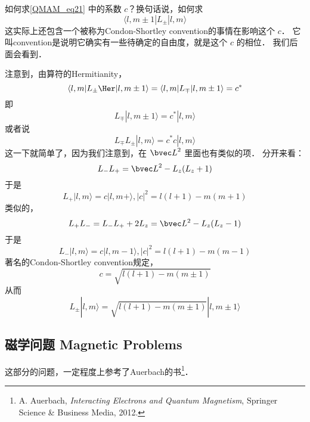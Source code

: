 \begin{exercise}{}\label{QMAM_exe2}
如何求\autoref{QMAM_eq21} 中的系数 $c$？换句话说，如何求
\begin{equation}
\langle l,m\pm1|L_{\pm}|l,m\rangle
\end{equation}
这实际上还包含一个被称为Condon-Shortley convention的事情在影响这个 $c$． 它叫convention是说明它确实有一些待确定的自由度，就是这个 $c$ 的相位． 我们后面会看到．

注意到，由算符的Hermitianity，
\begin{equation}
\langle l,m|L_{\pm}\Her|l,m\pm1\rangle = \langle l,m|L_{\mp}|l,m\pm1\rangle = c^*
\end{equation}
即
\begin{equation}
L_{\mp}|l,m\pm1\rangle = c^*|l,m\rangle
\end{equation}
或者说
\begin{equation}
L_{\mp}L_{\pm}|l,m\rangle = c^*c|l,m\rangle
\end{equation}
这一下就简单了，因为我们注意到，在 ${\bvec L}^2$ 里面也有类似的项． 分开来看：
\begin{equation}
L_-L_+ = {\bvec L}^2 - L_z(L_z+1)
\end{equation}
于是
\begin{equation}
L_+|l,m\rangle = c|l,m+\rangle, |c|^2 = l(l+1)-m(m+1)
\end{equation}
类似的，
\begin{equation}
L_+L_- = L_-L_+ +2L_z = {\bvec L^2} -L_z(L_z-1)
\end{equation}
于是
\begin{equation}
L_-|l,m\rangle = c|l,m-1\rangle, |c|^2 = l(l+1)-m(m-1) 
\end{equation}
著名的Condon-Shortley convention规定，
\begin{equation}
c = \sqrt{l(l+1) - m(m\pm1)}
\end{equation}
从而
\begin{equation}
L_{\pm}|l,m\rangle = \sqrt{l(l+1) - m(m\pm 1)}|l,m\pm1\rangle
\end{equation}
\end{exercise}

\subsection{磁学问题 Magnetic Problems}

这部分的问题，一定程度上参考了Auerbach的书\footnote{A. Auerbach, \textsl{Interacting Electrons and Quantum Magnetism}, Springer Science \& Business Media, 2012.}．